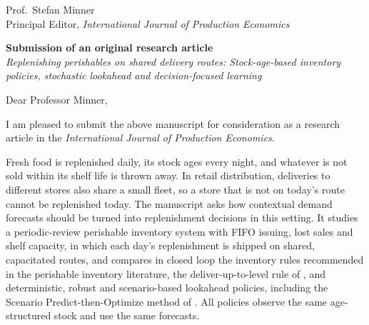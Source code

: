 \documentclass[11pt,a4paper]{article}
\begin{document}
\noindent Prof.\ Stefan Minner\\
Principal Editor, \textit{International Journal of Production Economics}

\bigskip
\noindent\textbf{Submission of an original research article}\\
\textit{Replenishing perishables on shared delivery routes: Stock-age-based inventory policies, stochastic lookahead and decision-focused learning}

\bigskip
\noindent Dear Professor Minner,

\medskip
I am pleased to submit the above manuscript for consideration as a research article in the \textit{International Journal of Production Economics}.

Fresh food is replenished daily, its stock ages every night, and whatever is not sold within its shelf life is thrown away. In retail distribution, deliveries to different stores also share a small fleet, so a store that is not on today's route cannot be replenished today. The manuscript asks how contextual demand forecasts should be turned into replenishment decisions in this setting. It studies a periodic-review perishable inventory system with FIFO issuing, lost sales and shelf capacity, in which each day's replenishment is shipped on shared, capacitated routes, and compares in closed loop the inventory rules recommended in the perishable inventory literature, the deliver-up-to-level rule of \citet{crama2018stochastic}, and deterministic, robust and scenario-based lookahead policies, including the Scenario Predict-then-Optimize method of \citet{jia2025scenario}. All policies observe the same age-structured stock and use the same forecasts.
\end{document}
